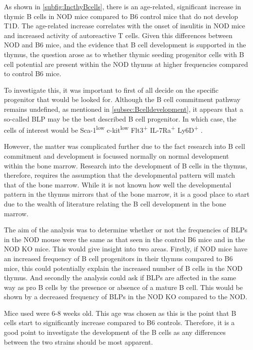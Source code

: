 As shown in \cref{subfig:IncthyBcells}, there is an age-related, significant increase in thymic B cells in NOD mice compared to B6 control mice that do not develop T1D.
The age-related increase correlates with the onset of insulitis in NOD mice and increased activity of autoreactive T cells.
Given this differences between NOD and B6 mice, and the evidence that B cell development is supported in the thymus, the question arose as to whether thymic seeding progenitor cells with B cell potential are present within the NOD thymus at higher frequencies compared to control B6 mice.

To investigate this, it was important to first of all decide on the specific progenitor that would be looked for.
Although the B cell commitment pathway remains undefined, as mentioned in \cref{subsec:Bcelldevelopment}, it appears that a so-called BLP may be the best described B cell progenitor.
In which case, the cells of interest would be Sca-1\textsuperscript{low} c-kit\textsuperscript{low} Flt3\textsuperscript{+} IL-7Ra\textsuperscript{+} Ly6D\textsuperscript{+} \citep{Mansson2010, Inlay2009, Zhang2013}.

However, the matter was complicated further due to the fact research into B cell commitment and development is focussed normally on normal development within the bone marrow.
Research into the development of B cells in the thymus, therefore, requires the assumption that the developmental pattern will match that of the bone marrow.
While it is not known how well the developmental pattern in the thymus mirrors that of the bone marrow, it is a good place to start due to the wealth of literature relating the B cell development in the bone marrow.

The aim of the analysis was to determine whether or not the frequencies of BLPs in the NOD mouse were the same as that seen in the control B6 mice and in the NOD KO mice.
This would give insight into two areas.
Firstly, if NOD mice have an increased frequency of B cell progenitors in their thymus compared to B6 mice, this could potentially explain the increased number of B cells in the NOD thymus.
And secondly the analysis could ask if BLPs are affected in the same way as pro B cells by the presence or absence of a mature B cell.
This would be shown by a decreased frequency of BLPs in the NOD KO compared to the NOD.

Mice used were 6-8 weeks old.
This age was chosen as this is the point that B cells start to significantly increase compared to B6 controls.
Therefore, it is a good point to investigate the development of the B cells as any differences between the two strains should be most apparent.




